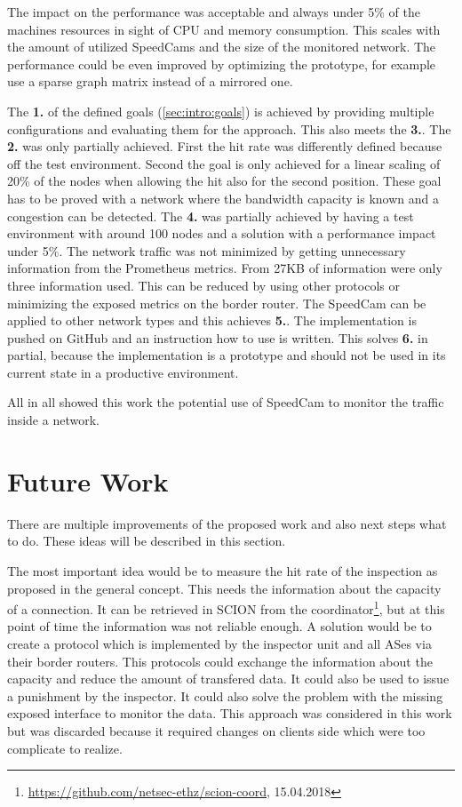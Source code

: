 \documentclass[thesis.tex]{subfiles}
\begin{document}
The impact on the performance was acceptable and always under 5\% of the machines resources in sight of CPU and memory consumption. This scales with the amount of utilized SpeedCams and the size of the monitored network. The performance could be even improved by optimizing the prototype, for example use a sparse graph matrix instead of a mirrored one. 

The \textbf{1.} of the defined goals (\autoref{sec:intro:goals}) is achieved by providing multiple configurations and evaluating them for the approach. This also meets the \textbf{3.}. The \textbf{2.} was only partially achieved. First the hit rate was differently defined because off the test environment. Second the goal is only achieved for a linear scaling of 20\% of the nodes when allowing the hit also for the second position. These goal has to be proved with a network where the bandwidth capacity is known and a congestion can be detected. The \textbf{4.} was partially achieved by having a test environment with around 100 nodes and a solution with a performance impact under 5\%. The network traffic was not minimized by getting unnecessary information from the Prometheus metrics. From 27KB of information were only three information used. This can be reduced by using other protocols or minimizing the exposed metrics on the border router. The SpeedCam can be applied to other network types and this achieves \textbf{5.}. The implementation is pushed on GitHub and an instruction how to use is written. This solves \textbf{6.} in partial, because the implementation is a prototype and should not be used in its current state in a productive environment. 

All in all showed this work the potential use of SpeedCam to monitor the traffic inside a network.

\section{Future Work} \label{sec:concl:future}
There are multiple improvements of the proposed work and also next steps what to do. These ideas will be described in this section.

The most important idea would be to measure the hit rate of the inspection as proposed in the general concept. This needs the information about the capacity of a connection. It can be retrieved in SCION from the coordinator\footnote{\url{https://github.com/netsec-ethz/scion-coord}, 15.04.2018}, but at this point of time the information was not reliable enough. A solution would be to create a protocol which is implemented by the inspector unit and all ASes via their border routers. This protocols could exchange the information about the capacity and reduce the amount of transfered data. It could also be used to issue a punishment by the inspector. It could also solve the problem with the missing exposed interface to monitor the data. This approach was considered in this work but was discarded because it required changes on clients side which were too complicate to realize.
\end{document}
